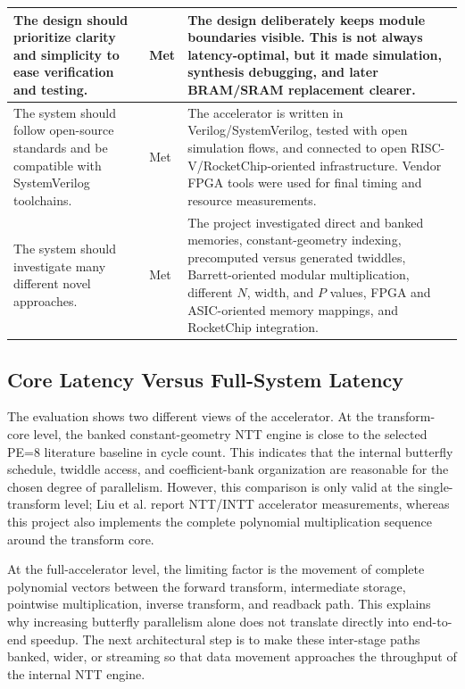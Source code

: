 \documentclass[a4paper, 12pt, titlepage]{article}
\begin{document}
\begin{table}[H]
\begin{tabularx}{\textwidth}{|>{\raggedright\arraybackslash}p{}|>{\centering\arraybackslash}p{}|>{\raggedright\arraybackslash}X|}
\hline
The design should prioritize clarity and simplicity to ease verification and testing. & Met & The design deliberately keeps module boundaries visible. This is not always latency-optimal, but it made simulation, synthesis debugging, and later BRAM/SRAM replacement clearer. \\
\hline
The system should follow open-source standards and be compatible with SystemVerilog toolchains. & Met & The accelerator is written in Verilog/SystemVerilog, tested with open simulation flows, and connected to open RISC-V/RocketChip-oriented infrastructure. Vendor FPGA tools were used for final timing and resource measurements. \\
\hline
The system should investigate many different novel approaches. & Met & The project investigated direct and banked memories, constant-geometry indexing, precomputed versus generated twiddles, Barrett-oriented modular multiplication, different \(N\), width, and \(P\) values, FPGA and ASIC-oriented memory mappings, and RocketChip integration. \\
\hline
\end{tabularx}
\end{table}


\subsection{Core Latency Versus Full-System Latency}

The evaluation shows two different views of the accelerator. At the
transform-core level, the banked constant-geometry NTT engine is close to the
selected PE=8 literature baseline in cycle count. This indicates that the
internal butterfly schedule, twiddle access, and coefficient-bank organization
are reasonable for the chosen degree of parallelism. However, this comparison is
only valid at the single-transform level; Liu et al. report NTT/INTT
accelerator measurements, whereas this project also implements the complete
polynomial multiplication sequence around the transform core.

At the full-accelerator level, the limiting factor is the movement of complete
polynomial vectors between the forward transform, intermediate storage,
pointwise multiplication, inverse transform, and readback path. This explains
why increasing butterfly parallelism alone does not translate directly into
end-to-end speedup. The next architectural step is to make these inter-stage
paths banked, wider, or streaming so that data movement approaches the
throughput of the internal NTT engine.
\end{document}
